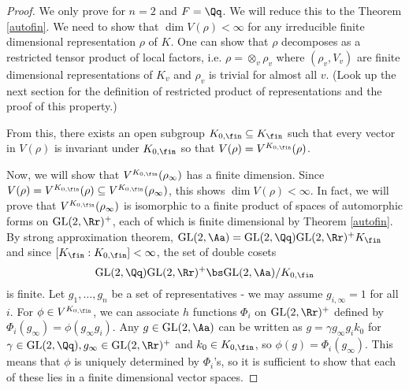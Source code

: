 \documentclass{article}
\newcommand{\GL}{\mathrm{GL}}
\begin{document}
\begin{proof}
We only prove for $n = 2$ and $F = \Qq$. We will reduce this to the Theorem \ref{autofin}. 
We need to show that $\dim V(\rho) < \infty$ for any irreducible finite dimensional representation $\rho$ of $K$. 
One can show that $\rho$ decomposes as a restricted tensor product of local factors, i.e. $\rho = \otimes_{v} \rho_{v}$ where $(\rho_{v}, V_{v})$ are finite dimensional representations of $K_v$ and $\rho_v$ is trivial for almost all $v$. (Look up the next section for the definition of restricted product of representations and the proof of this property.)
\begin{comment}
Indeed, no small subgroup argument implies that $\ker \rho$ contains an open subgroup of $K_{\fin}$, so ti contains $K_v$ for all but finitely many $v$. 
Then $\rho$ factors through the projection 
$$
K \twoheadrightarrow K/ \left[ \prod_{v\not\in S}K_v\right] \simeq \prod_{v\in S} K_v
$$
for some finite set of places $S$ containing $S_{\infty}$. 
Now $\rho$ is a representation of a finite direct product of compact groups, and it factors as $\otimes_{v\in S} \rho_v$ where $\rho_v$ is an irreducible representation of $K_v$. Then the original $\rho$ is the restricted tensor product of $\rho_v$'s where $(\rho_v, V_v)$ are trivial for $v\not\in S$. 
\end{comment}
From this, there exists an open subgroup $K_{0, \fin}\subseteq K_{\fin}$ such that every vector in $V(\rho)$ is invariant under $K_{0, \fin}$ so that $V(\rho) = V^{K_{0,\fin}}(\rho)$. 

Now, we will show that $V^{K_{0, \fin}}(\rho_\infty)$ has a finite dimension. Since $V(\rho) = V^{K_{0, \fin}}(\rho) \subseteq V^{K_{0, \fin}}(\rho_{\infty})$, this shows  $\dim V(\rho) <\infty$. 
In fact, we will prove that $V^{K_{0, \fin}}(\rho_{\infty})$ is isomorphic  to  a finite product of spaces of automorphic forms on $\GL(2, \Rr)^{+}$, each of which is finite dimensional by Theorem \ref{autofin}. By strong approximation theorem, $\GL(2, \Aa) =\GL(2,\Qq)\GL(2, \Rr)^{+}K_\fin$ and since $[K_{\fin}:K_{0, \fin}] < \infty$, the set of double cosets
$$
\GL(2, \Qq) \GL(2, \Rr)^{+} \bs \GL(2, \Aa)/K_{0, \fin}
$$
is finite. 
Let $g_1, \dots, g_n$ be a set of representatives - we may assume $g_{i, \infty} = 1$ for all $i$. For $\phi\in V^{K_{0, \fin}}$, we can associate $h$ functions $\Phi_i$ on $\GL(2, \Rr)^{+}$  defined by $\Phi_{i}(g_\infty) = \phi(g_{\infty}g_{i})$. 
Any $g\in \GL(2, \Aa)$ can be written as $g = \gamma g_{\infty}g_{i}k_{0}$ for $\gamma\in \GL(2, \Qq), g_{\infty} \in \GL(2, \Rr)^{+}$ and $k_{0} \in K_{0, \fin}$, so $\phi(g) = \Phi_{i}(g_{\infty})$. 
This means that $\phi$ is uniquely determined by $\Phi_i$'s, so it is sufficient to show that each of these lies in a finite dimensional vector spaces. 


\end{proof}
\end{document}
